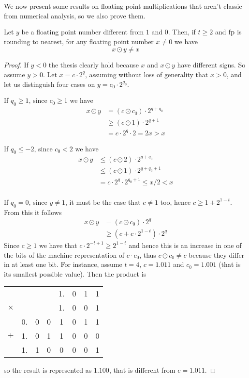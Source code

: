 We now present some results on floating point multiplications that aren't classic from numerical analysis, so we also prove them.
\begin{prop}\label{appA:th:mult-no-fixpoints}
	Let $y$ be a floating point number different from $1$ and $0$. Then, if $t \ge 2$ and $\text{fp}$ is rounding to nearest, for any floating point number $x \neq 0$ we have
	\[
	x \odot y \neq x
	\]
\end{prop}
\begin{proof}
	If $y < 0$ the thesis clearly hold because $x$ and $x \odot y$ have different signs. So assume $y > 0$.
	Let $x = c \cdot 2^q$, assuming without loss of generality that $x > 0$, and let us distinguish four cases on $y = c_0 \cdot 2^{q_0}$.

	If $q_0 \ge 1$, since $c_0 \ge 1$ we have
	\begin{align*}
		x \odot y &= (c \odot c_0) \cdot 2^{q + q_0} \\
		&\ge (c \odot 1) \cdot 2^{q + 1} \\
		&= c \cdot 2^{q} \cdot 2 = 2 x > x
	\end{align*}

	If $q_0 \le -2$, since $c_0 < 2$ we have
	\begin{align*}
		x \odot y &\le (c \odot 2) \cdot 2^{q + q_0} \\
		&\le (c \odot 1) \cdot 2^{q + q_0 + 1} \\
		&= c \cdot 2^{q} \cdot 2^{q_0 + 1} \le x / 2 < x\\
	\end{align*}

	If $q_0 = 0$, since $y \neq 1$, it must be the case that $c \neq 1$ too, hence $c \ge 1 + 2^{1-t}$. From this it follows
	\begin{align*}
		x \odot y &= (c \odot c_0) \cdot 2^q \\
		&\ge (c + c \cdot 2^{1-t}) \cdot 2^q
	\end{align*}
	Since $c \ge 1$ we have that $c \cdot 2^{-t+1} \ge 2^{1-t}$ and hence this is an increase in one of the bits of the machine representation of $c \cdot c_0$, thus $c \odot c_0 \neq c$ because they differ in at least one bit.
	For instance, assume $t = 4$, $c = 1.011$ and $c_0 = 1.001$ (that is its smallest possible value). Then the product is
	\begin{center}
		\begin{tabular}{c@{\;}c@{\,}c@{\,}c@{\,}c@{\,}c@{\,}c@{\,}c}
			& & & & 1. & 0 & 1 & 1 \\
			$\times$ & & & & 1. & 0 & 0 & 1 \\
			\hline
			& 0. & 0 & 0 & 1 & 0 & 1 & 1 \\
			$+$ & 1. & 0 & 1 & 1 & 0 & 0 & 0 \\
			\hline
			& 1. & 1 & 0 & 0 & 0 & 0 & 1
		\end{tabular}
	\end{center}
	so the result is represented as $1.100$, that is different from $c = 1.011$.


\end{proof}

